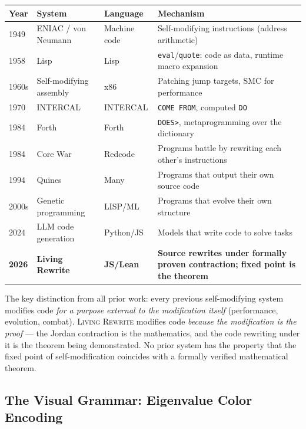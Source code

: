 \documentclass[12pt, letterpaper]{article}
\theoremstyle{plain}
\theoremstyle{definition}
\theoremstyle{remark}
\newcommand{\novel}[1]{\textcolor{SovOrange}{\textsc{#1}}}
\begin{document}
\begin{center}
\small
\renewcommand{\arraystretch}{1.4}
\begin{tabular}{@{}lllp{5.5cm}@{}}
\toprule
\textbf{Year} & \textbf{System} & \textbf{Language} & \textbf{Mechanism} \\
\midrule
1949 & ENIAC / von Neumann & Machine code & Self-modifying instructions (address arithmetic) \\
1958 & Lisp & Lisp & \texttt{eval}/\texttt{quote}: code as data, runtime macro expansion \\
1960s & Self-modifying assembly & x86 & Patching jump targets, SMC for performance \\
1970 & INTERCAL & INTERCAL & \texttt{COME FROM}, computed \texttt{DO} \\
1984 & Forth & Forth & \texttt{DOES>}, metaprogramming over the dictionary \\
1984 & Core War & Redcode & Programs battle by rewriting each other's instructions \\
1994 & Quines & Many & Programs that output their own source code \\
2000s & Genetic programming & LISP/ML & Programs that evolve their own structure \\
2024 & LLM code generation & Python/JS & Models that write code to solve tasks \\
\textbf{2026} & \textbf{Living Rewrite} & \textbf{JS/Lean} & \textbf{Source rewrites under formally proven contraction; fixed point is the theorem} \\
\bottomrule
\end{tabular}
\end{center}

The key distinction from all prior work: every previous self-modifying system
modifies code \textit{for a purpose external to the modification itself}
(performance, evolution, combat). \novel{Living Rewrite} modifies code \textit{because
the modification is the proof} --- the Jordan contraction is the mathematics,
and the code rewriting under it is the theorem being demonstrated.
No prior system has the property that the fixed point of self-modification coincides
with a formally verified mathematical theorem.

\subsection{The Visual Grammar: Eigenvalue Color Encoding}
\end{document}
